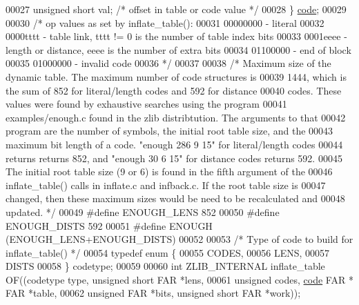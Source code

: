 \begin{DoxyCode}
00027     \textcolor{keywordtype}{unsigned} \textcolor{keywordtype}{short} val;         \textcolor{comment}{/* offset in table or code value */}
00028 \} \hyperlink{structcode}{code};
00029 
00030 \textcolor{comment}{/* op values as set by inflate\_table():}
00031 \textcolor{comment}{    00000000 - literal}
00032 \textcolor{comment}{    0000tttt - table link, tttt != 0 is the number of table index bits}
00033 \textcolor{comment}{    0001eeee - length or distance, eeee is the number of extra bits}
00034 \textcolor{comment}{    01100000 - end of block}
00035 \textcolor{comment}{    01000000 - invalid code}
00036 \textcolor{comment}{ */}
00037 
00038 \textcolor{comment}{/* Maximum size of the dynamic table.  The maximum number of code structures is}
00039 \textcolor{comment}{   1444, which is the sum of 852 for literal/length codes and 592 for distance}
00040 \textcolor{comment}{   codes.  These values were found by exhaustive searches using the program}
00041 \textcolor{comment}{   examples/enough.c found in the zlib distribtution.  The arguments to that}
00042 \textcolor{comment}{   program are the number of symbols, the initial root table size, and the}
00043 \textcolor{comment}{   maximum bit length of a code.  "enough 286 9 15" for literal/length codes}
00044 \textcolor{comment}{   returns returns 852, and "enough 30 6 15" for distance codes returns 592.}
00045 \textcolor{comment}{   The initial root table size (9 or 6) is found in the fifth argument of the}
00046 \textcolor{comment}{   inflate\_table() calls in inflate.c and infback.c.  If the root table size is}
00047 \textcolor{comment}{   changed, then these maximum sizes would be need to be recalculated and}
00048 \textcolor{comment}{   updated. */}
00049 \textcolor{preprocessor}{#define ENOUGH\_LENS 852}
00050 \textcolor{preprocessor}{#define ENOUGH\_DISTS 592}
00051 \textcolor{preprocessor}{#define ENOUGH (ENOUGH\_LENS+ENOUGH\_DISTS)}
00052 
00053 \textcolor{comment}{/* Type of code to build for inflate\_table() */}
00054 \textcolor{keyword}{typedef} \textcolor{keyword}{enum} \{
00055     CODES,
00056     LENS,
00057     DISTS
00058 \} codetype;
00059 
00060 \textcolor{keywordtype}{int} ZLIB\_INTERNAL inflate\_table OF((codetype type, \textcolor{keywordtype}{unsigned} \textcolor{keywordtype}{short} FAR *lens,
00061                              \textcolor{keywordtype}{unsigned} codes, \hyperlink{structcode}{code} FAR * FAR *table,
00062                              \textcolor{keywordtype}{unsigned} FAR *bits, \textcolor{keywordtype}{unsigned} \textcolor{keywordtype}{short} FAR *work));
\end{DoxyCode}
